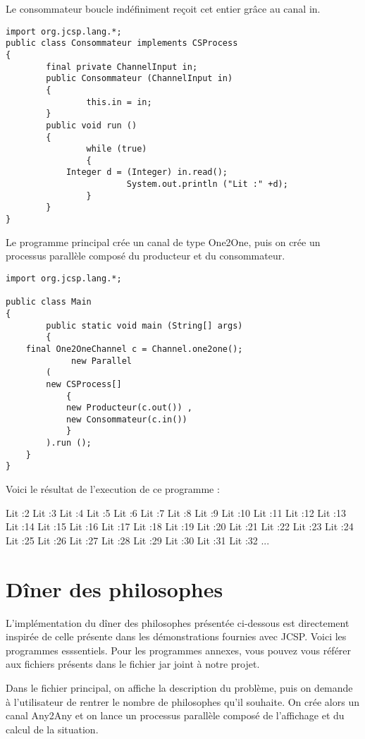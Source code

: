 \documentclass[a4paper,11pt,french]{report}
\begin{document}
Le consommateur boucle indéfiniment reçoit cet entier grâce au canal in.

\begin{lstlisting}[frame=trBL,title={Producteurs-Consommateurs: Consommateur.java}]
import org.jcsp.lang.*;
public class Consommateur implements CSProcess
{
        final private ChannelInput in;
        public Consommateur (ChannelInput in)
        {
                this.in = in;
        }
        public void run ()
        {
                while (true)
                {
			Integer d = (Integer) in.read();
                        System.out.println ("Lit :" +d);
                }
        }
}
\end{lstlisting}

Le programme principal crée un canal de type One2One, puis on crée un processus parallèle composé du producteur et du consommateur.

\begin{lstlisting}[frame=trBL,title={Producteurs-Consommateurs: Main.java}]
import org.jcsp.lang.*;

public class Main
{
        public static void main (String[] args)
        {
	final One2OneChannel c = Channel.one2one();
             new Parallel
		(
		new CSProcess[]
			{
			new Producteur(c.out()) ,
			new Consommateur(c.in())
			} 
		).run ();
	}
}
\end{lstlisting}

Voici le résultat de l'execution de ce programme :

Lit :2
Lit :3
Lit :4
Lit :5
Lit :6
Lit :7
Lit :8
Lit :9
Lit :10
Lit :11
Lit :12
Lit :13
Lit :14
Lit :15
Lit :16
Lit :17
Lit :18
Lit :19
Lit :20
Lit :21
Lit :22
Lit :23
Lit :24
Lit :25
Lit :26
Lit :27
Lit :28
Lit :29
Lit :30
Lit :31
Lit :32
...
 
\section{Dîner des philosophes}

L'implémentation du dîner des philosophes présentée ci-dessous est directement inspirée de celle présente dans les démonstrations fournies avec JCSP. Voici les programmes esssentiels. Pour les programmes annexes, vous pouvez vous référer aux fichiers présents dans le fichier jar joint à notre projet.

Dans le fichier principal, on affiche la description du problème, puis on demande à l'utilisateur de rentrer le nombre de philosophes qu'il souhaite. On crée alors un canal Any2Any et on lance un processus parallèle composé de l'affichage et du calcul de la situation.
\end{document}
